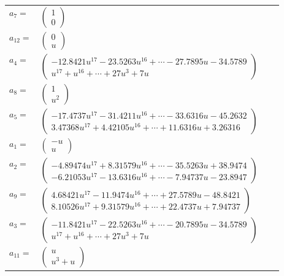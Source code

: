 \documentclass[1p]{elsarticle_modified}
\theoremstyle{definition}
\begin{document}
\begin{tabular}{m{7pt} m{180pt} m{7pt} m{180pt} }
\flushright $a_{7}=$&$\begin{pmatrix}1\\0\end{pmatrix}$ \\
\flushright $a_{12}=$&$\begin{pmatrix}0\\u\end{pmatrix}$ \\
\flushright $a_{4}=$&$\begin{pmatrix}-12.8421 u^{17}-23.5263 u^{16}+\cdots-27.7895 u-34.5789\\u^{17}+u^{16}+\cdots+27 u^3+7 u\end{pmatrix}$ \\
\flushright $a_{8}=$&$\begin{pmatrix}1\\u^2\end{pmatrix}$ \\
\flushright $a_{5}=$&$\begin{pmatrix}-17.4737 u^{17}-31.4211 u^{16}+\cdots-33.6316 u-45.2632\\3.47368 u^{17}+4.42105 u^{16}+\cdots+11.6316 u+3.26316\end{pmatrix}$ \\
\flushright $a_{1}=$&$\begin{pmatrix}- u\\u\end{pmatrix}$ \\
\flushright $a_{2}=$&$\begin{pmatrix}-4.89474 u^{17}+8.31579 u^{16}+\cdots-35.5263 u+38.9474\\-6.21053 u^{17}-13.6316 u^{16}+\cdots-7.94737 u-23.8947\end{pmatrix}$ \\
\flushright $a_{9}=$&$\begin{pmatrix}4.68421 u^{17}-11.9474 u^{16}+\cdots+27.5789 u-48.8421\\8.10526 u^{17}+9.31579 u^{16}+\cdots+22.4737 u+7.94737\end{pmatrix}$ \\
\flushright $a_{3}=$&$\begin{pmatrix}-11.8421 u^{17}-22.5263 u^{16}+\cdots-20.7895 u-34.5789\\u^{17}+u^{16}+\cdots+27 u^3+7 u\end{pmatrix}$ \\
\flushright $a_{11}=$&$\begin{pmatrix}u\\u^3+u\end{pmatrix}$ \\

\end{tabular}
\end{document}

